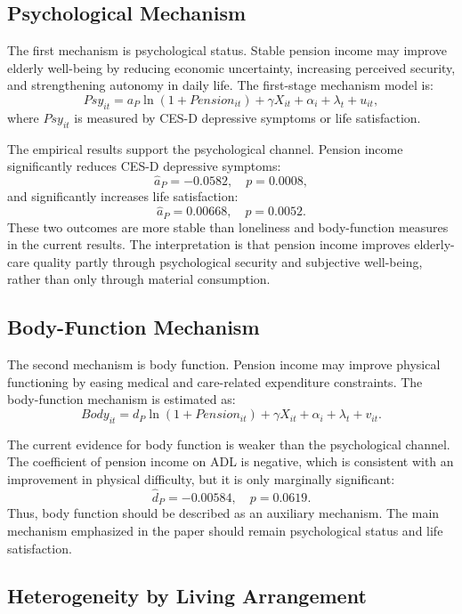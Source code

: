 \subsection{Psychological Mechanism}

The first mechanism is psychological status. Stable pension income may improve elderly well-being by reducing economic uncertainty, increasing perceived security, and strengthening autonomy in daily life. The first-stage mechanism model is:
\begin{equation}
Psy_{it}=a_P \ln(1+Pension_{it})+\gamma X_{it}+\alpha_i+\lambda_t+u_{it},
\end{equation}
where \(Psy_{it}\) is measured by CES-D depressive symptoms or life satisfaction.

The empirical results support the psychological channel. Pension income significantly reduces CES-D depressive symptoms:
\[
\widehat{a}_P=-0.0582,\quad p=0.0008,
\]
and significantly increases life satisfaction:
\[
\widehat{a}_P=0.00668,\quad p=0.0052.
\]
These two outcomes are more stable than loneliness and body-function measures in the current results. The interpretation is that pension income improves elderly-care quality partly through psychological security and subjective well-being, rather than only through material consumption.

\subsection{Body-Function Mechanism}

The second mechanism is body function. Pension income may improve physical functioning by easing medical and care-related expenditure constraints. The body-function mechanism is estimated as:
\begin{equation}
Body_{it}=d_P \ln(1+Pension_{it})+\gamma X_{it}+\alpha_i+\lambda_t+v_{it}.
\end{equation}

The current evidence for body function is weaker than the psychological channel. The coefficient of pension income on ADL is negative, which is consistent with an improvement in physical difficulty, but it is only marginally significant:
\[
\widehat{d}_P=-0.00584,\quad p=0.0619.
\]
Thus, body function should be described as an auxiliary mechanism. The main mechanism emphasized in the paper should remain psychological status and life satisfaction.

\subsection{Heterogeneity by Living Arrangement}

